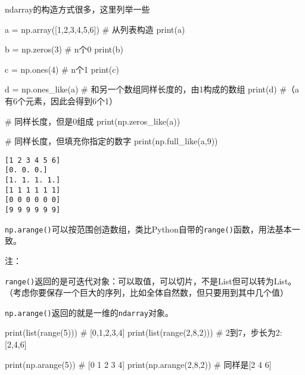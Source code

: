 \documentclass[
  letterpaper,
  DIV=11,
  numbers=noendperiod]{scrreprt}
\newenvironment{Shaded}{\begin{snugshade}}{\end{snugshade}}
\newcommand{\BuiltInTok}[1]{\textcolor[rgb]{0.00,0.23,0.31}{#1}}
\newcommand{\CommentTok}[1]{\textcolor[rgb]{0.37,0.37,0.37}{#1}}
\newcommand{\DecValTok}[1]{\textcolor[rgb]{0.68,0.00,0.00}{#1}}
\newcommand{\NormalTok}[1]{\textcolor[rgb]{0.00,0.23,0.31}{#1}}
\newcommand{\OperatorTok}[1]{\textcolor[rgb]{0.37,0.37,0.37}{#1}}
\begin{document}
ndarray的构造方式很多，这里列举一些

\begin{Shaded}
\begin{Highlighting}[]
\NormalTok{a }\OperatorTok{=}\NormalTok{ np.array([}\DecValTok{1}\NormalTok{,}\DecValTok{2}\NormalTok{,}\DecValTok{3}\NormalTok{,}\DecValTok{4}\NormalTok{,}\DecValTok{5}\NormalTok{,}\DecValTok{6}\NormalTok{]) }\CommentTok{\# 从列表构造}
\BuiltInTok{print}\NormalTok{(a)}

\NormalTok{b }\OperatorTok{=}\NormalTok{ np.zeros(}\DecValTok{3}\NormalTok{) }\CommentTok{\# n个0}
\BuiltInTok{print}\NormalTok{(b)}

\NormalTok{c }\OperatorTok{=}\NormalTok{ np.ones(}\DecValTok{4}\NormalTok{) }\CommentTok{\# n个1}
\BuiltInTok{print}\NormalTok{(c)}

\NormalTok{d }\OperatorTok{=}\NormalTok{ np.ones\_like(a) }\CommentTok{\# 和另一个数组同样长度的，由1构成的数组}
\BuiltInTok{print}\NormalTok{(d) }\CommentTok{\#（a有6个元素，因此会得到6个1）}

\CommentTok{\# 同样长度，但是0组成}
\BuiltInTok{print}\NormalTok{(np.zeros\_like(a))}

\CommentTok{\# 同样长度，但填充你指定的数字}
\BuiltInTok{print}\NormalTok{(np.full\_like(a,}\DecValTok{9}\NormalTok{))}
\end{Highlighting}
\end{Shaded}

\begin{verbatim}
[1 2 3 4 5 6]
[0. 0. 0.]
[1. 1. 1. 1.]
[1 1 1 1 1 1]
[0 0 0 0 0 0]
[9 9 9 9 9 9]
\end{verbatim}

\texttt{np.arange()}可以按范围创造数组，类比Python自带的\texttt{range()}函数，用法基本一致。

注：

\texttt{range()}返回的是可迭代对象：可以取值，可以切片，不是List但可以转为List。（考虑你要保存一个巨大的序列，比如全体自然数，但只要用到其中几个值）

\texttt{np.arange()}返回的就是一维的\texttt{ndarray}对象。

\begin{Shaded}
\begin{Highlighting}[]
\BuiltInTok{print}\NormalTok{(}\BuiltInTok{list}\NormalTok{(}\BuiltInTok{range}\NormalTok{(}\DecValTok{5}\NormalTok{))) }\CommentTok{\# [0,1,2,3,4]}
\BuiltInTok{print}\NormalTok{(}\BuiltInTok{list}\NormalTok{(}\BuiltInTok{range}\NormalTok{(}\DecValTok{2}\NormalTok{,}\DecValTok{8}\NormalTok{,}\DecValTok{2}\NormalTok{))) }\CommentTok{\# 2到7，步长为2: [2,4,6]}

\BuiltInTok{print}\NormalTok{(np.arange(}\DecValTok{5}\NormalTok{)) }\CommentTok{\# [0 1 2 3 4]}
\BuiltInTok{print}\NormalTok{(np.arange(}\DecValTok{2}\NormalTok{,}\DecValTok{8}\NormalTok{,}\DecValTok{2}\NormalTok{)) }\CommentTok{\# 同样是[2 4 6]}
\end{Highlighting}
\end{Shaded}
\end{document}
